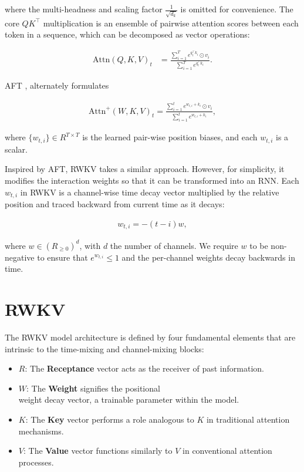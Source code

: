 where the multi-headness and scaling factor $\frac{1}{\sqrt{d_k}}$ is omitted for convenience. The core $QK^\top$ multiplication is an ensemble of pairwise attention scores between each token in a sequence, which can be decomposed as vector operations:

\begin{align}
\mathrm{Attn}(Q, K, V)_t &= \frac{\sum_{i=1}^{T} e^{q^{\top}_t k_i} \odot v_i}{\sum_{i=1}^{T} e^{q^{\top}_t k_i}}.

\end{align}

AFT \cite{zhai2021attention}, alternately formulates

\begin{align}

\mathrm{Attn}^{+}(W,K,V)_t = \frac{ \sum_{i=1}^{t} e^{w_{t,i}+k_i} \odot v_i}{\sum_{i=1}^{t} e^{w_{t,i}+k_i}},
\end{align}

where $\{w_{t,i}\}\in R^{T\times T}$ is the learned pair-wise position biases, and each $w_{t,i}$ is a scalar.

Inspired by AFT, RWKV takes a similar approach. However, for simplicity, it modifies the interaction weights so that it can be transformed into an RNN. Each $w_{t,i}$ in RWKV is a channel-wise time decay vector multiplied by the relative position and traced backward from current time as it decays:

\begin{align}
    w_{t,i} = -(t-i)w,
\end{align}

where $w\in (R_{\geq 0})^{d}$, with $d$ the number of channels. We require $w$ to be non-negative to ensure that $e^{w_{t,i}} \le 1$ and the per-channel weights decay backwards in time.

\section{RWKV} 
\label{rwkv_model}

The RWKV model architecture is defined by four fundamental elements that are intrinsic to the time-mixing and channel-mixing blocks:

\begin{itemize}
    \item $R$: The \textbf{Receptance} vector acts as the receiver of past information.
    \item $W$: The \textbf{Weight} signifies the positional \\ weight decay vector, a trainable parameter within the model.
    \item $K$: The \textbf{Key} vector performs a role analogous to $K$ in traditional attention mechanisms. 
    \item $V$: The \textbf{Value} vector functions similarly to $V$ in conventional attention processes.
\end{itemize}

